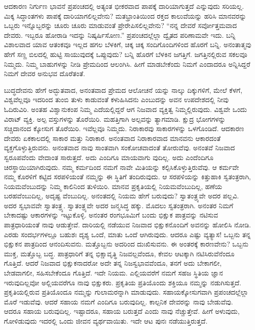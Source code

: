 ಆದಕಾರಣ ನಿರ್ಗುಣ ಭಾವನೆ ಪ್ರಪಂಚದಲ್ಲಿ ಅತ್ಯಂತ ಭೀಕರವಾದ ಪಾಪಕ್ಕೆ ದಾರಿಯಾಗುತ್ತದೆ ಎನ್ನುವುದು ಸರಿಯಲ್ಲ. ಮಿಕ್ಕ ಸಿದ್ಧಾಂತಗಳು ಪಾಪಕ್ಕೆ ದಾರಿಯಾಗಲಿಲ್ಲವೇನು? ಮತಭ್ರಾಂತಿಯಿಂದ ರಕ್ತದ ಕಾಲುವೆಯನ್ನು ಹರಿಸಿ ಮಾನವರನ್ನು ಒಬ್ಬರು ಇನ್ನೊಬ್ಬರನ್ನು ಚೂರು ಚೂರು ಮಾಡುವಂತೆ ಪ್ರೇರೇಪಿಸಲಿಲ್ಲವೇನು? “ನನ್ನ ದೇವರೆ ಸರ್ವೋತ್ತಮವಾದ ದೇವರು. ಇಬ್ಬರೂ ಹೋರಾಡಿ ಇದನ್ನು ನಿಷ್ಕರ್ಷಿಸೋಣ.” ಪ್ರಪಂಚದಲ್ಲೆಲ್ಲಾ ದ್ವೈತದ ಪರಿಣಾಮವೇ ಇದು. ಬನ್ನಿ ವಿಶಾಲವಾದ ಯಾವ ಆತಂಕವೂ ಇಲ್ಲದ ಹಗಲ ಬೆಳಕಿಗೆ, ಚಿಕ್ಕ ಚಿಕ್ಕ ಸಂದಿಗೊಂದಿಗಳಿಂದ ಹೊರಗೆ ಬನ್ನಿ. ಅನಂತಾತ್ಮವು ಹೇಗೆ ಸಣ್ಣ ಬಿಲದಲ್ಲಿ ಹುಟ್ಟಿ ಸಾಯುವುದಕ್ಕೆ ಒಪ್ಪುವುದು? ಬನ್ನಿ ಹೊರಗೆ ಬೆಳಕಿನ ಜಗತ್ತಿಗೆ. ಜಗತ್ತಿನಲ್ಲಿರುವ ಸಕಲವೂ ನಿಮ್ಮದು. ನಿಮ್ಮ ಬಾಹುಗಳನ್ನು ನೀಡಿ ಪ್ರೇಮದಿಂದ ಆಲಂಗಿಸಿ. ಹೀಗೆ ಮಾಡಬೇಕೆಂದು ನಿಮಗೆ ಎಂದಾದರೂ ಅನ್ನಿಸಿದ್ದರೆ ನಿಮಗೆ ದೇವರ ಅನುಭವ ದೊರೆತಂತೆ.

ಬುದ್ಧದೇವನು ಹೇಗೆ ಅದ್ಭುತವಾದ, ಅನಂತವಾದ ಪ್ರೇಮದ ಆಲೋಚನೆ ಯನ್ನು ನಾಲ್ಕು ದಿಕ್ಕುಗಳಿಗೆ, ಮೇಲೆ ಕೆಳಗೆ, ವಿಶ್ವವೆಲ್ಲವೂ ಇದರಿಂದ ತುಂಬಿ ತುಳು ಕಾಡುವಂತೆ ಕಳುಹಿಸಿದನು ಎಂಬುದನ್ನು ಅವನ ಉಪದೇಶದಲ್ಲಿ ನೀವು ಓದಿರುವಿರಿ. ಅಂತಹ ವಿಶ್ವಾನುಕಂಪ ನಿಮ್ಮ ಎದೆಯಲ್ಲಿದ್ದರೆ ಆಗ ನಿಜವಾದ ವ್ಯಕ್ತಿತ್ವ ನಿಮ್ಮಲ್ಲಿರುವುದು. ವಿಶ್ವವೇ ಒಂದು ವಿರಾಟ್​ ವ್ಯಕ್ತಿ. ಅಲ್ಪ ವಸ್ತುಗಳನ್ನು ತೊರೆಯಿರಿ. ಮಹತ್ತಿಗಾಗಿ ಅಲ್ಪವನ್ನು ತ್ಯಾಗಮಾಡಿ. ಕ್ಷುದ್ರ ಭೋಗಗಳನ್ನು ಸಚ್ಚಿದಾನಂದ ಕ್ಕೋಸುಗ ತೊರೆಯಿರಿ. ಇವೆಲ್ಲವೂ ನಿಮ್ಮದು. ನಿರಾಕಾರವು ಸಾಕಾರಗಳನ್ನು ಒಳಗೊಂಡಿದೆ. ಆದಕಾರಣ ದೇವರು ಏಕಕಾಲದಲ್ಲಿ ಸಾಕಾರ ಮತ್ತು ನಿರಾಕಾರ. ಅನಂತವಾದ ನಿರಾಕಾರವಾದ ಮಾನವನು ಆಕಾರದಂತೆ ವ್ಯಕ್ತಗೊಳ್ಳುತ್ತಿರುವನು. ಅನಂತವಾದ ನಾವು ಸಾಂತವಾಗಿ ಸಂಕೋಚವಾದಂತೆ ತೋರುವೆವು. ಅನಂತವೆ ನಿಜವಾದ ಸ್ವರೂಪವೆಂದು ವೇದಾಂತ ಸಾರುತ್ತದೆ. ಅದು ಎಂದಿಗೂ ಮಾಯವಾಗು ವುದಿಲ್ಲ. ಅದು ಎಂದೆಂದಿಗೂ ಚಿರಸ್ಥಾಯಿಯಾಗಿರುವುದು. ನಮ್ಮ ಕರ್ಮದಿಂದ ನಮಗೆ ನಾವೇ ಮಿತಿಯನ್ನು ಕಲ್ಪಿಸಿಕೊಳ್ಳುತ್ತಿರುವೆವು. ಆ ಕರ್ಮವೇ ನಮ್ಮ ಕೊರಳಿಗೆ ಕಟ್ಟಿದ ಸರಪಳಿಯಂತೆ ನಮ್ಮನ್ನು ಈ ಸ್ಥಿತಿಗೆ ತಂದಿರುವುದು. ಆ ಸರಪಳಿಯನ್ನು ಕಿತ್ತುಹಾಕಿ ಸ್ವತಂತ್ರರಾಗಿ, ನಿಯಮವೆಂಬುದನ್ನು ನಿಮ್ಮ ಕಾಲಿನಿಂದ ತುಳಿಯಿರಿ. ಮಾನವ ಪ್ರಕೃತಿಯಲ್ಲಿ ನಿಯಮವೆಂಬುದಿಲ್ಲ, ಹಣೆಯ ಬರಹವೆಂಬುದಿಲ್ಲ, ಅದೃಷ್ಟ ವೆಂಬುದಿಲ್ಲ. ಅನಂತದಲ್ಲಿ ನಿಯಮ ಹೇಗೆ ಬರುವುದು? ಸ್ವಾತಂತ್ರ್ಯವೇ ಅದರ ಪಲ್ಲವಿ. ಅದರ ಸ್ವಭಾವವೇ ಸ್ವಾತಂತ್ರ್ಯ. ಸ್ವಾತಂತ್ರ್ಯವೇ ಅದರ ಜನ್ಮಸಿದ್ಧ ಹಕ್ಕು. ಮೊದಲು ಸ್ವತಂತ್ರರಾಗಿ. ಅನಂತರ ನಿಮಗೆ ಬೇಕಾದಷ್ಟು ಆಕಾರಗಳನ್ನು ಇಟ್ಟುಕೊಳ್ಳಿ. ಅನಂತರ ರಂಗಭೂಮಿಗೆ ಬಂದು ಭಿಕ್ಷುಕ ಪಾತ್ರವನ್ನು ನಟಿಸುವ ಪಾತ್ರಧಾರಿಯಂತೆ ನಾವು ಆಡುತ್ತೇವೆ. ದಾರಿಯಲ್ಲಿ ನಡೆಯುವ ನಿಜವಾದ ಭಿಕ್ಷುಕನೊಂದಿಗೆ ಅವನನ್ನು ಹೋಲಿಸಿ ನೋಡಿ. ಎರಡು ಸಂದರ್ಭಗಳಲ್ಲೂ ಬಹುಶಃ ದೃಶ್ಯ ಒಂದೆ, ಮಾತು ಒಂದೆ ಆಗಿರುವುದು. ಆದರೂ ಎಷ್ಟು ವ್ಯತ್ಯಾಸ! ಒಬ್ಬನು ತನ್ನ ಭಿಕ್ಷುಕನ ಪಾತ್ರದಿಂದ ಆನಂದಿಸುವನು. ಮತ್ತೊಬ್ಬನು ಅದರಿಂದ ದುಃಖಿಸುವನು. ಈ ಅಂತರಕ್ಕೆ ಕಾರಣವೇನು? ಒಬ್ಬನು ಮುಕ್ತ, ಮತ್ತೊಬ್ಬ ಬದ್ಧ. ಪಾತ್ರಧಾರಿಗೆ ತನ್ನ ಭಿಕ್ಷಾವೃತ್ಥಿ ನಿಜವಲ್ಲವೆಂದೂ, ಕೇವಲ ಆಟಕ್ಕಾಗಿ ನಟಿಸಿರುವೆನೆಂದೂ ಗೊತ್ತಿದೆ. ಆದರೆ ನಿಜವಾದ ಭಿಕ್ಷುಕನಾದರೋ ಅದೇ ತನ್ನ ನಿಜಸ್ವಭಾವವೆಂದೂ, ತನಗೆ ಅದು ಬೇಕಾಗಲೀ, ಬೇಡವಾಗಲೀ, ಸಹಿಸಬೇಕೆಂದೂ ಗೊತ್ತಿದೆ. ಇದೇ ನಿಯಮ. ಎಲ್ಲಿಯವರೆಗೆ ನಮಗೆ ಸಹಜ ಸ್ಥಿತಿಯ ಜ್ಞಾನ ಇರುವುದಿಲ್ಲವೋ ಅಲ್ಲಿಯವರೆಗೂ ನಾವು ಭಿಕ್ಷುಕರು. ಪ್ರಕೃತಿಯ ಪ್ರತಿಯೊಂದು ಶಕ್ತಿಯೂ ನಮ್ಮನ್ನು ನಡುಗಿಸುತ್ತದೆ. ಪ್ರಕೃತಿಯಲ್ಲಿರುವ ಪ್ರತಿಯೊಂದೂ ನಮ್ಮನ್ನು ಗುಲಾಮರನ್ನಾಗಿ ಮಾಡುವುದು. ಸಹಾಯಕ್ಕೋಸುಗವಾಗಿ ಪ್ರಪಂಚದಲ್ಲೆಲ್ಲಾ ಮೊರೆ ಇಡುವೆವು. ಆದರೆ ಸಹಾಯ ನಮಗೆ ಎಂದಿಗೂ ಬರುವುದಿಲ್ಲ. ಕಾಲ್ಪನಿಕ ದೇವರನ್ನು ನಾವು ಬೇಡುವೆವು. ಆದರೂ ಸಹಾಯ ಬರುವುದಿಲ್ಲ. ಇಷ್ಟಾದರೂ, ಸಹಾಯ ಬರುತ್ತದೆ ಎಂದು ನಾವು ನೆಚ್ಚುತ್ತೇವೆ. ಹೀಗೆ ಅಳುವುದು, ಗೋಳಿಡುವುದು ಇದರಲ್ಲಿ ಒಂದು ಜೀವನ ವ್ಯರ್ಥವಾಯಿತು. ಇದೇ ಆಟ ಪುನಃ ನಡೆಯುತ್ತಿರುತ್ತದೆ.

